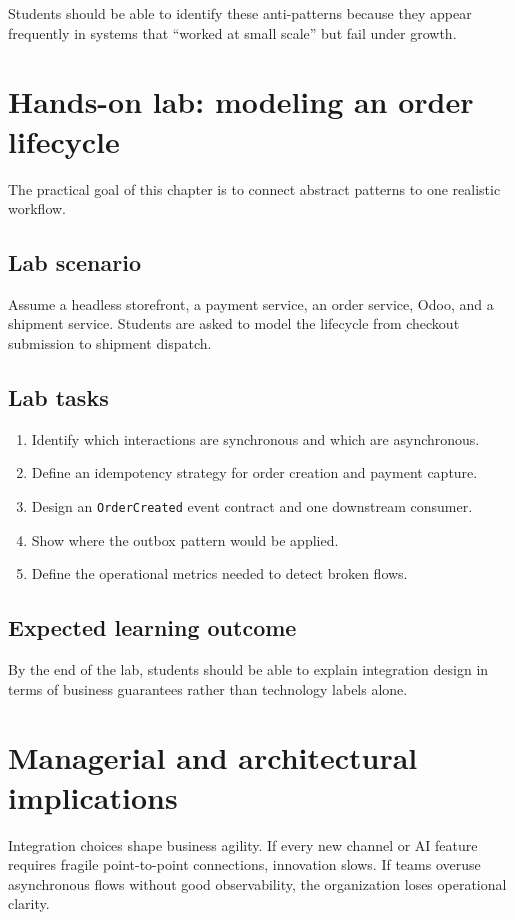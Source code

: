 Students should be able to identify these anti-patterns because they appear frequently in systems that ``worked at small scale'' but fail under growth.

\section{Hands-on lab: modeling an order lifecycle}
The practical goal of this chapter is to connect abstract patterns to one realistic workflow.

\subsection{Lab scenario}
Assume a headless storefront, a payment service, an order service, Odoo, and a shipment service.
Students are asked to model the lifecycle from checkout submission to shipment dispatch.

\subsection{Lab tasks}
\begin{enumerate}
  \item Identify which interactions are synchronous and which are asynchronous.
  \item Define an idempotency strategy for order creation and payment capture.
  \item Design an \texttt{OrderCreated} event contract and one downstream consumer.
  \item Show where the outbox pattern would be applied.
  \item Define the operational metrics needed to detect broken flows.
\end{enumerate}

\subsection{Expected learning outcome}
By the end of the lab, students should be able to explain integration design in terms of business guarantees rather than technology labels alone.

\section{Managerial and architectural implications}
Integration choices shape business agility.
If every new channel or AI feature requires fragile point-to-point connections, innovation slows.
If teams overuse asynchronous flows without good observability, the organization loses operational clarity.

